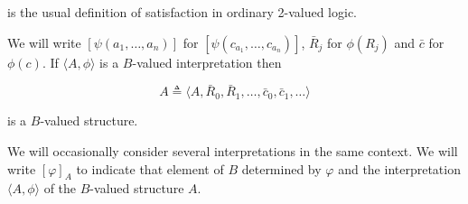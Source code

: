 is the usual definition of satisfaction in ordinary 2-valued logic.

We will write $[\psi(a_1, \ldots, a_n)]$ for $[\psi(c_{a_1}, \ldots, c_{a_n})]$, $\bar{R}_j$ for $\phi(R_j)$ and $\bar{c}$ for $\phi(c)$. If $\langle A, \phi \rangle$ is a $B$-valued interpretation then

$$A \triangleq \langle A, \bar{R}_0, \bar{R}_1, \ldots, \bar{c}_0, \bar{c}_1, \ldots \rangle$$

is a $B$-valued structure.

We will occasionally consider several interpretations in the same context. We will write $[\varphi]_A$ to indicate that element of $B$ determined by $\varphi$ and the interpretation $\langle A, \phi \rangle$ of the $B$-valued structure $A$.
